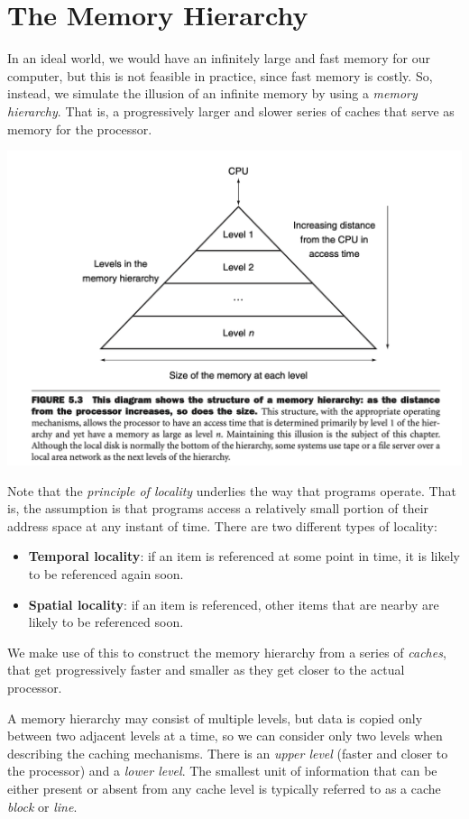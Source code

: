 \documentclass[10pt,a4paper]{article}
\begin{document}
\section{The Memory Hierarchy}

In an ideal world, we would have an infinitely large and fast memory for our computer, but this is not feasible in practice, since fast memory is costly. So, instead, we simulate the illusion of an infinite memory by using a \textit{memory hierarchy}. That is, a progressively larger and slower series of caches that serve as memory for the processor.
\begin{center}
    \includegraphics[scale=0.35]{images/memory_levels.png}
\end{center}
Note that the \textit{principle of locality} underlies the way that programs operate. That is, the assumption is that programs access a relatively small portion of their address space at any instant of time. There are two different types of locality:
\begin{itemize}
    \item \textbf{Temporal locality}: if an item is referenced at some point in time, it is likely to be referenced again soon.
    \item \textbf{Spatial locality}: if an item is referenced, other items that are nearby are likely to be referenced soon.
\end{itemize}
We make use of this to construct the memory hierarchy from a series of \textit{caches}, that get progressively faster and smaller as they get closer to the actual processor.

A memory hierarchy may consist of multiple levels, but data is copied only between two adjacent levels at a time, so we can consider only two levels when describing the caching mechanisms. There is an \textit{upper level} (faster and closer to the processor) and a \textit{lower level}. The smallest unit of information that can be either present or absent from any cache level is typically referred to as a cache \textit{block} or \textit{line}.
\end{document}
